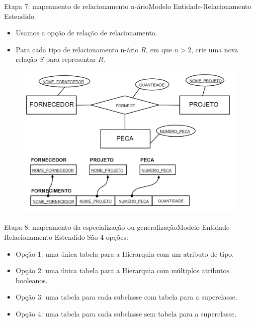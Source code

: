 \documentclass[t]{beamer}
\begin{document}

\begin{ftst}{Etapa 7: mapeamento de relacionamento n-ário}{Modelo Entidade-Relacionamento Estendido}
\small
\begin{itemize}
    \item Usamos a opção de relação de relacionamento.
    \item Para cada tipo de relacionamento n-ário $R$, em que $n > 2$, crie uma nova relação $S$ para representar $R$.
\end{itemize}
\begin{figure}
    \centering
    \includegraphics[scale=0.15]{Figuras/03_12.png}
\end{figure}
\end{ftst}


\begin{ftst}{Etapa 8: mapeamento da especialização ou generalização}{Modelo Entidade-Relacionamento Estendido}
\small
São 4 opções:
\begin{itemize}
    \item Opção 1: uma única tabela para a Hierarquia com um atributo de tipo.
    \item Opção 2: uma única tabela para a Hierarquia com múltiplos atributos booleanos.
    \item Opção 3: uma tabela para cada subclasse com tabela para a superclasse. 
    \item Opção 4: uma tabela para cada subclasse sem tabela para a superclasse. 
\end{itemize}
\end{ftst}
\end{document}
